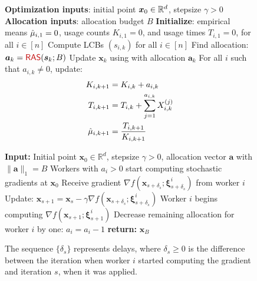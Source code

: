 \begin{figure*}[h]
    \begin{minipage}[t]{0.48\textwidth}

\begin{algorithm}[H]
	\caption{}
    \label{alg:asgd-ata}
	\begin{algorithmic}[1]
		\STATE \textbf{Optimization inputs}: initial point $\bm{x}_0 \in \mathbb{R}^d$, stepsize $\gamma > 0$
        \STATE \textbf{Allocation inputs}: allocation budget  $B$
        \STATE \textbf{Initialize}: empirical means $\hat{\mu}_{i,1} = 0$, usage counts $K_{i,1} = 0$, and usage times $T_{i,1} = 0$, for all $i \in [n]$
        \STATE Compute LCBs $(s_{i,k})$ for all $i \in [n]$
        \STATE Find allocation:
        $
        \bm{a}_k = \algname{RAS} (\bm{s}_k; B)
        $
        \STATE Update $\bm{x}_k$ using  with allocation $\bm{a}_k$
        \STATE For all $i$ such that $a_{i,k} \neq 0$, update:
        \begin{align*}
            K_{i,k+1} &= K_{i,k} + a_{i,k} \\
            T_{i,k+1} &= T_{i,k} + \sum_{j=1}^{a_{i,k}} X_{i,k}^{(j)} \\
            \hat{\mu}_{i,k+1} &= \frac{T_{i,k+1}}{K_{i,k+1}} \\
        \end{align*}
        \vspace{-1cm}
		\ENDFOR
	\end{algorithmic}
\end{algorithm}

\end{minipage}
\hfill
\begin{minipage}[t]{0.48\textwidth}

    \begin{algorithm}[H]
        \caption{}
        \label{alg:asgd}
        \begin{algorithmic}[1]
            \STATE \textbf{Input:} Initial point $\bm{x}_0 \in \mathbb{R}^d$, stepsize $\gamma > 0$, allocation vector $\bm{a}$ with $\|\bm{a}\|_1 = B$
            \STATE Workers with $a_i > 0$ start computing stochastic gradients at $\bm{x}_0$
                \STATE Receive gradient $\nabla f(\bm{x}_{s+\delta_s}; \bm{\xi}_{s+\delta_s}^{i})$ from worker $i$
                \STATE Update: $\bm{x}_{s+1} = \bm{x}_{s} - \gamma \nabla f(\bm{x}_{s+\delta_s}; \bm{\xi}_{s+\delta_s}^{i})$
                    \STATE Worker $i$ begins computing $\nabla f(\bm{x}_{s+1}; \bm{\xi}_{s+1}^{i})$
                    \STATE Decrease remaining allocation for worker $i$ by one: $a_i = a_i - 1$
                \ENDIF
            \ENDFOR
            \STATE \textbf{return:} $\bm{x}_{B}$
        \end{algorithmic}
        \vspace{0.2cm}
        The sequence $\{\delta_s\}$ represents delays, where $\delta_s \geq 0$ is the difference between the iteration when worker $i$ started computing the gradient and iteration $s$, when it was applied.
    \end{algorithm}


\end{minipage}
\end{figure*}
